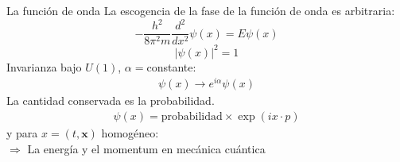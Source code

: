 \documentclass[%
xcolor=pdftex,dvipsnames,table%
]{beamer}
\begin{document}
{
\begin{frame}[plain]
  \begin{block}{La función de onda}
    La escogencia de la fase de la función de onda es arbitraria:    
    \begin{equation*}
      -\frac{h^2}{8\pi^2m}\frac{d^2}{dx^2}\psi(x)=E\psi(x)
    \end{equation*}
    \begin{equation*}
      \left|\psi(x)\right|^2=1
    \end{equation*}
Invarianza bajo $U(1)$, $\alpha=$constante: 
\begin{align*}
  \psi(x)\to e^{i\alpha}\psi(x)
\end{align*}
La cantidad conservada es la probabilidad.
\begin{align*}
  \psi(x)=\text{probabilidad}\times\exp{(i x\cdot p)}
\end{align*}
y para $x=(t,\mathbf{x})$ homogéneo:\\ 
$\Longrightarrow$ La energía y el momentum en mecánica cuántica

  \end{block}

\end{frame}
}
\end{document}
